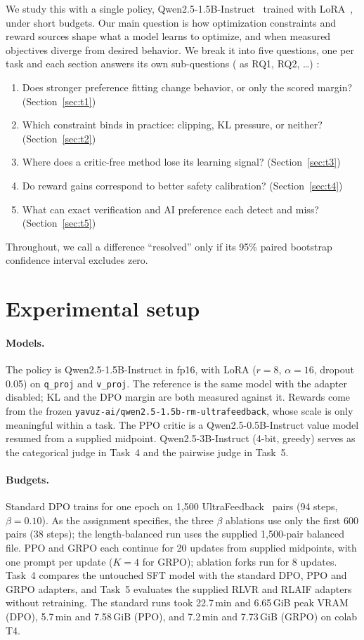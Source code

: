 \documentclass{article}
\begin{document}
We study this with a single policy, Qwen2.5-1.5B-Instruct~\cite{qwen2025} trained with LoRA~\cite{hu2022lora}, under short budgets. Our main question is how optimization constraints and reward sources shape what a model learns to optimize, and when measured objectives diverge from desired behavior. We break it into five questions, one per task and each section answers its own sub-questions ( as RQ1, RQ2, \ldots) :
\begin{enumerate}
    \item Does stronger preference fitting change behavior, or only the scored margin? (Section~\ref{sec:t1})
    \item Which constraint binds in practice: clipping, KL pressure, or neither? (Section~\ref{sec:t2})
    \item Where does a critic-free method lose its learning signal? (Section~\ref{sec:t3})
    \item Do reward gains correspond to better safety calibration? (Section~\ref{sec:t4})
    \item What can exact verification and AI preference each detect and miss? (Section~\ref{sec:t5})
\end{enumerate}
Throughout, we call a difference ``resolved'' only if its 95\% paired bootstrap confidence interval excludes zero.

\section{Experimental setup}

\paragraph{Models.}
The policy is Qwen2.5-1.5B-Instruct in fp16, with LoRA ($r=8$, $\alpha=16$, dropout 0.05) on \texttt{q\_proj} and \texttt{v\_proj}. The reference is the same model with the adapter disabled; KL and the DPO margin are both measured against it. Rewards come from the frozen \texttt{yavuz-ai/qwen2.5-1.5b-rm-ultrafeedback}, whose scale is only meaningful within a task. The PPO critic is a Qwen2.5-0.5B-Instruct value model resumed from a supplied midpoint. Qwen2.5-3B-Instruct (4-bit, greedy) serves as the categorical judge in Task~4 and the pairwise judge in Task~5.

\paragraph{Budgets.}
Standard DPO trains for one epoch on 1,500 UltraFeedback~\cite{cui2023ultrafeedback} pairs (94 steps, $\beta=0.10$). As the assignment specifies, the three $\beta$ ablations use only the first 600 pairs (38 steps); the length-balanced run uses the supplied 1,500-pair balanced file. PPO and GRPO each continue for 20 updates from supplied midpoints, with one prompt per update ($K=4$ for GRPO); ablation forks run for 8 updates. Task~4 compares the untouched SFT model with the standard DPO, PPO and GRPO adapters, and Task~5 evaluates the supplied RLVR and RLAIF adapters without retraining. The standard runs took 22.7\,min and 6.65\,GiB peak VRAM (DPO), 5.7\,min and 7.58\,GiB (PPO), and 7.2\,min and 7.73\,GiB (GRPO) on colab T4.
\end{document}
